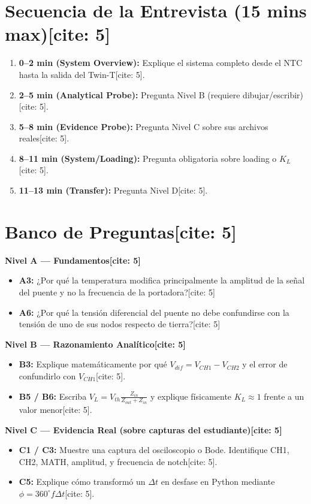 \documentclass[11pt, a4paper]{article}
\begin{document}
\section*{Secuencia de la Entrevista (15 mins max)[cite: 5]}
\begin{enumerate}
    \item \textbf{0–2 min (System Overview):} Explique el sistema completo desde el NTC hasta la salida del Twin-T[cite: 5].
    \item \textbf{2–5 min (Analytical Probe):} Pregunta Nivel B (requiere dibujar/escribir)[cite: 5].
    \item \textbf{5–8 min (Evidence Probe):} Pregunta Nivel C sobre sus archivos reales[cite: 5].
    \item \textbf{8–11 min (System/Loading):} Pregunta obligatoria sobre loading o $K_L$[cite: 5].
    \item \textbf{11–13 min (Transfer):} Pregunta Nivel D[cite: 5].
\end{enumerate}

\section*{Banco de Preguntas[cite: 5]}
\textbf{Nivel A — Fundamentos[cite: 5]}
\begin{itemize}
    \item \textbf{A3:} ¿Por qué la temperatura modifica principalmente la amplitud de la señal del puente y no la frecuencia de la portadora?[cite: 5]
    \item \textbf{A6:} ¿Por qué la tensión diferencial del puente no debe confundirse con la tensión de uno de sus nodos respecto de tierra?[cite: 5]
\end{itemize}

\textbf{Nivel B — Razonamiento Analítico[cite: 5]}
\begin{itemize}
    \item \textbf{B3:} Explique matemáticamente por qué $V_{dif} = V_{CH1} - V_{CH2}$ y el error de confundirlo con $V_{CH1}$[cite: 5].
    \item \textbf{B5 / B6:} Escriba $V_L = V_{th} \frac{Z_{in}}{Z_{out}+Z_{in}}$ y explique físicamente $K_L \approx 1$ frente a un valor menor[cite: 5].
\end{itemize}

\textbf{Nivel C — Evidencia Real (sobre capturas del estudiante)[cite: 5]}
\begin{itemize}
    \item \textbf{C1 / C3:} Muestre una captura del osciloscopio o Bode. Identifique CH1, CH2, MATH, amplitud, y frecuencia de notch[cite: 5].
    \item \textbf{C5:} Explique cómo transformó un $\Delta t$ en desfase en Python mediante $\phi = 360^\circ f \Delta t$[cite: 5].
\end{itemize}
\end{document}
